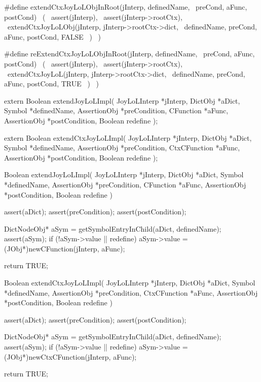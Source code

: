 #define extendCtxJoyLoLObjInRoot(jInterp, definedName,  \
  preCond, aFunc, postCond)                             \
  (                                                     \
    assert(jInterp),                                    \
    assert(jInterp->rootCtx),                           \
    extendCtxJoyLoLObj(jInterp, jInterp->rootCtx->dict, \
      definedName, preCond, aFunc, postCond, FALSE      \
    )                                                   \
  )
  
#define reExtendCtxJoyLoLObjInRoot(jInterp, definedName,  \
  preCond, aFunc, postCond)                               \
  (                                                       \
    assert(jInterp),                                      \
    assert(jInterp->rootCtx),                             \
    extendCtxJoyLoL(jInterp, jInterp->rootCtx->dict,      \
      definedName, preCond, aFunc, postCond, TRUE         \
    )                                                     \
  )
\stopCHeader

\setCHeaderStream{private}
\startCHeader
extern Boolean extendJoyLoLImpl(
  JoyLoLInterp *jInterp,
  DictObj      *aDict,
  Symbol       *definedName,
  AssertionObj *preCondition,
  CFunction    *aFunc,
  AssertionObj *postCondition,
  Boolean       redefine
);

extern Boolean extendCtxJoyLoLImpl(
  JoyLoLInterp *jInterp,
  DictObj      *aDict,
  Symbol       *definedName,
  AssertionObj *preCondition,
  CtxCFunction *aFunc,
  AssertionObj *postCondition,
  Boolean       redefine
);
\stopCHeader
\setCHeaderStream{public}

\startCCode
Boolean extendJoyLoLImpl(
  JoyLoLInterp *jInterp,
  DictObj      *aDict,
  Symbol       *definedName,
  AssertionObj *preCondition,
  CFunction    *aFunc,
  AssertionObj *postCondition,
  Boolean       redefine
) {
  assert(aDict);
  assert(preCondition);
  assert(postCondition);

  DictNodeObj* aSym = getSymbolEntryInChild(aDict, definedName);
  assert(aSym);
  if (!aSym->value || redefine) {
    aSym->value =
      (JObj*)newCFunction(jInterp, aFunc);
  }

  return TRUE;
}

Boolean extendCtxJoyLoLImpl(
  JoyLoLInterp *jInterp,
  DictObj      *aDict,
  Symbol       *definedName,
  AssertionObj *preCondition,
  CtxCFunction *aFunc,
  AssertionObj *postCondition,
  Boolean       redefine
) {
  assert(aDict);
  assert(preCondition);
  assert(postCondition);

  DictNodeObj* aSym = getSymbolEntryInChild(aDict, definedName);
  assert(aSym);
  if (!aSym->value || redefine) {
    aSym->value =
      (JObj*)newCtxCFunction(jInterp, aFunc);
  }

  return TRUE;
}
\stopCCode

